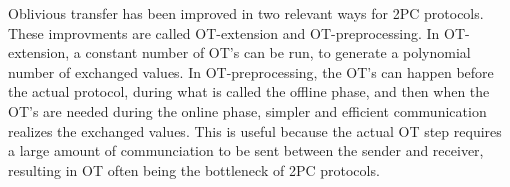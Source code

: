Oblivious transfer has been improved in two relevant ways for 2PC protocols. 
These improvments are called OT-extension and OT-preprocessing. 
In OT-extension, a constant number of OT's can be run, to generate a polynomial number of exchanged values.
In OT-preprocessing, the OT's can happen before the actual protocol, during what is called the offline phase, and then when the OT's are needed during the online phase, simpler and efficient communication realizes the exchanged values.
This is useful because the actual OT step requires a large amount of communciation to be sent between the sender and receiver, resulting in OT often being the bottleneck of 2PC protocols.
